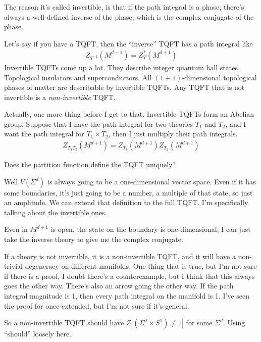 The reason it's called invertible,
is that if the path integral is a phase,
there's always a well-defined inverse of the phase,
which is the complex-conjugate of the phase.

Let's say if you have a TQFT,
then the ``inverse'' TQFT has a path integral like
\begin{align}
    Z_{T^{-1}}\left( M^{d+1} \right)
    =
    Z_T^*\left( M^{d+1} \right)
\end{align}
Invertible TQFTs come up a lot.
They describe integer quantum hall states.
Topological insulators and superconductors.
All $(1+1)$-dimensional topological phases of matter are describable by
invertible TQFTs.
Any TQFT that is not invertible is a \emph{non-invertible} TQFT.\@

Actually, one more thing before I get to that.
Invertible TQFTs form an Abelian group.
Suppose that I have the path integral for two theories $T_1$ and $T_2$,
and I want the path integral for $T_1\times T_2$,
then I just multiply their path integrals.
\begin{align}
    Z_{T_1T_2}\left( M^{d+1} \right)
    =
    Z_{T_1}\left( M^{d+1} \right)
    Z_{T_2}\left( M^{d+1} \right)
\end{align}

\begin{question}
    Does the partition function define the TQFT uniquely?
\end{question}
Well $V(\Sigma^d)$ is always going to be a one-dimensional vector space.
Even if it has some boundaries,
it's just going to be a number,
a multiple of that state,
so just an amplitude.
We can extend that definition to the full TQFT.
I'm specifically talking about the invertible ones.

Even in $M^{d+1}$ is open,
the state on the boundary is one-dimensional,
I can just take the inverse theory to give me the complex conjugate.

If a theory is not invertible,
it is a non-invertible TQFT,
and it will have a non-trivial degeneracy on different manifolds.
One thing that is true,
but I'm not sure if there is a proof,
I doubt there's a counterexample,
but I think that this always goes the other way.
There's also an arrow going the other way.
If the path integral magnitude is 1,
then every path integral on the manifold is 1.
I've seen the proof for once-extended,
but I'm not sure if it's general.

So a non-invertible TQFT should have
$Z|\left( \Sigma^d\times S^1 \right)\ne 1|$
for some $\Sigma^d$.
Using ``should'' loosely here.

